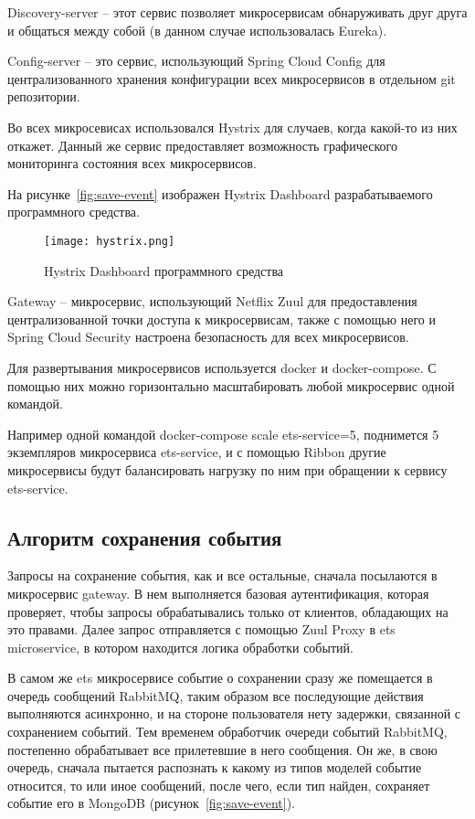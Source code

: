 Discovery-server -- этот сервис позволяет микросервисам обнаруживать друг друга и общаться между собой (в данном случае использовалась Eureka).


Config-server -- это сервис, использующий Spring Cloud Config для централизованного хранения конфигурации всех микросервисов в отдельном git репозитории.

Во всех микросевисах использовался Hystrix для случаев, когда какой-то из них откажет. Данный же сервис предоставляет возможность графического мониторинга состояния всех микросервисов.


На рисунке~\ref{fig:save-event} изображен Hystrix Dashboard разрабатываемого программного средства.
\begin{figure}[ht]
\centering
  \texttt{[image: hystrix.png]}  
  \caption{Hystrix Dashboard программного средства}
  \label{fig:hystrix}
\end{figure} 



Gateway -- микросервис, использующий Netflix Zuul для предоставления централизованной точки доступа к микросервисам, также с помощью него и Spring Cloud Security настроена безопасность для всех микросервисов.


Для развертывания микросервисов используется docker и docker-compose.
С помощью них можно горизонтально масштабировать любой микросервис одной командой. 

Например одной командой docker-compose scale ets-service=5, поднимется 5 экземпляров микросервиса ets-service, и с помощью Ribbon другие микросервисы будут балансировать нагрузку по ним при обращении к сервису ets-service.


\subsection{Алгоритм сохранения события}
\label{sub:development:save_event}
Запросы на сохранение события, как и все остальные, сначала посылаются в микросервис gateway. В нем выполняется базовая аутентификация, которая проверяет, чтобы запросы обрабатывались только от клиентов, обладающих на это правами. Далее запрос отправляется с помощью Zuul Proxy в ets microservice, в котором находится логика обработки событий.

В самом же ets микросервисе событие о сохранении сразу же помещается в очередь сообщений RabbitMQ, таким образом все последующие действия выполняются асинхронно, и на стороне пользователя нету задержки, связанной с сохранением событий. Тем временем обработчик очереди событий RabbitMQ, постепенно обрабатывает все прилетевшие в него сообщения. Он же, в свою очередь, сначала пытается распознать к какому из типов моделей событие относится, то или иное сообщений, после чего, если тип найден, сохраняет событие его в MongoDB (рисунок~\ref{fig:save-event}).

